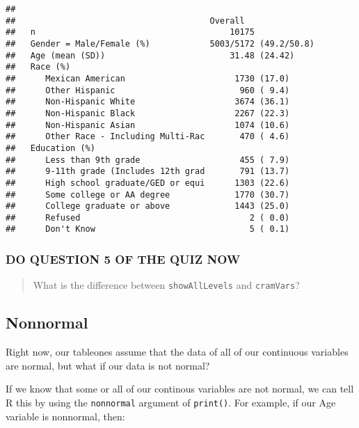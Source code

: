 \documentclass[
]{book}
\begin{document}
\begin{verbatim}
##                                      
##                                       Overall               
##   n                                       10175             
##   Gender = Male/Female (%)            5003/5172 (49.2/50.8) 
##   Age (mean (SD))                         31.48 (24.42)     
##   Race (%)                                                  
##      Mexican American                      1730 (17.0)      
##      Other Hispanic                         960 ( 9.4)      
##      Non-Hispanic White                    3674 (36.1)      
##      Non-Hispanic Black                    2267 (22.3)      
##      Non-Hispanic Asian                    1074 (10.6)      
##      Other Race - Including Multi-Rac       470 ( 4.6)      
##   Education (%)                                             
##      Less than 9th grade                    455 ( 7.9)      
##      9-11th grade (Includes 12th grad       791 (13.7)      
##      High school graduate/GED or equi      1303 (22.6)      
##      Some college or AA degree             1770 (30.7)      
##      College graduate or above             1443 (25.0)      
##      Refused                                  2 ( 0.0)      
##      Don't Know                               5 ( 0.1)
\end{verbatim}

\hypertarget{do-question-5-of-the-quiz-now-4}{%
\subsubsection{DO QUESTION 5 OF THE QUIZ NOW}\label{do-question-5-of-the-quiz-now-4}}

\begin{quote}
What is the difference between \texttt{showAllLevels} and \texttt{cramVars}?
\end{quote}

\hypertarget{nonnormal}{%
\subsection{Nonnormal}\label{nonnormal}}

Right now, our tableones assume that the data of all of our continuous variables are normal, but what if our data is not normal?

If we know that some or all of our continous variables are not normal, we can tell R this by using the \texttt{nonnormal} argument of \texttt{print()}. For example, if our Age variable is nonnormal, then:
\end{document}
